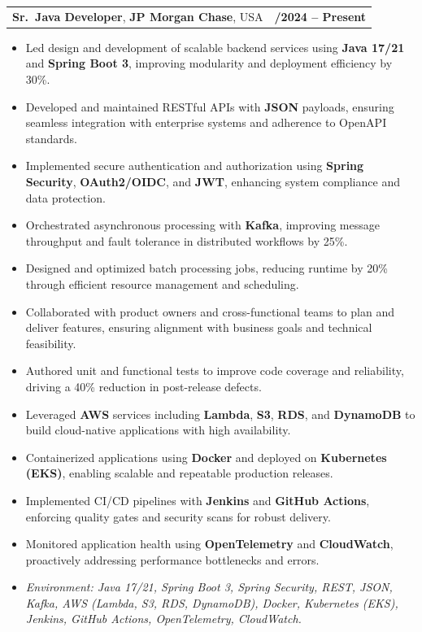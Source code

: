 \documentclass[letterpaper,11pt]{article}
\makeatletter
\newcommand{\resumeItem}[1]{
  \item\footnotesize{
    {#1 \vspace{-2pt}}
  }
}
\newcommand{\resumeSubheading}[4]{
  \vspace{-2pt}\item
    \begin{tabular*}{1.0\textwidth}[t]{l@{\extracolsep{\fill}}r}
      \textbf{\fontsize{10pt}{14pt}\selectfont #3}, \textbf{\fontsize{10pt}{14pt}\selectfont #1}, \fontsize{10pt}{14pt}\selectfont #4 & \textbf{\fontsize{10pt}{14pt}\selectfont #2} \\
    \end{tabular*}\vspace{-7pt}
}
\newcommand{\resumeItemListStart}{\begin{itemize}[leftmargin=*]}
\newcommand{\resumeItemListEnd}{\end{itemize}\vspace{-5pt}}
\makeatother
\begin{document}
\resumeSubheading
{JP Morgan Chase}{09/2024 -- Present}
{Sr.\ Java Developer}{USA}
\resumeItemListStart
  \resumeItem{Led design and development of scalable backend services using \textbf{Java 17/21} and \textbf{Spring Boot 3}, improving modularity and deployment efficiency by 30\%.}
  \resumeItem{Developed and maintained RESTful APIs with \textbf{JSON} payloads, ensuring seamless integration with enterprise systems and adherence to OpenAPI standards.}
  \resumeItem{Implemented secure authentication and authorization using \textbf{Spring Security}, \textbf{OAuth2/OIDC}, and \textbf{JWT}, enhancing system compliance and data protection.}
  \resumeItem{Orchestrated asynchronous processing with \textbf{Kafka}, improving message throughput and fault tolerance in distributed workflows by 25\%.}
  \resumeItem{Designed and optimized batch processing jobs, reducing runtime by 20\% through efficient resource management and scheduling.}
  \resumeItem{Collaborated with product owners and cross-functional teams to plan and deliver features, ensuring alignment with business goals and technical feasibility.}
  \resumeItem{Authored unit and functional tests to improve code coverage and reliability, driving a 40\% reduction in post-release defects.}
  \resumeItem{Leveraged \textbf{AWS} services including \textbf{Lambda}, \textbf{S3}, \textbf{RDS}, and \textbf{DynamoDB} to build cloud-native applications with high availability.}
  \resumeItem{Containerized applications using \textbf{Docker} and deployed on \textbf{Kubernetes (EKS)}, enabling scalable and repeatable production releases.}
  \resumeItem{Implemented CI/CD pipelines with \textbf{Jenkins} and \textbf{GitHub Actions}, enforcing quality gates and security scans for robust delivery.}
  \resumeItem{Monitored application health using \textbf{OpenTelemetry} and \textbf{CloudWatch}, proactively addressing performance bottlenecks and errors.}
  \resumeItem{\textit{Environment: Java 17/21, Spring Boot 3, Spring Security, REST, JSON, Kafka, AWS (Lambda, S3, RDS, DynamoDB), Docker, Kubernetes (EKS), Jenkins, GitHub Actions, OpenTelemetry, CloudWatch.}}
\resumeItemListEnd
\end{document}
